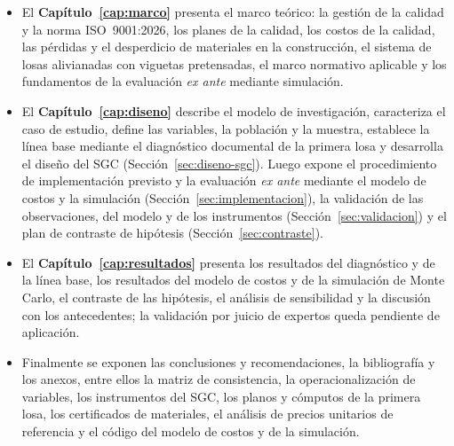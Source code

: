 \begin{itemize}
  \item El \textbf{Capítulo~\ref{cap:marco}} presenta el marco teórico: la gestión de la calidad y la norma ISO~9001:2026, los planes de la calidad, los costos de la calidad, las pérdidas y el desperdicio de materiales en la construcción, el sistema de losas alivianadas con viguetas pretensadas, el marco normativo aplicable y los fundamentos de la evaluación \emph{ex ante} mediante simulación.
  \item El \textbf{Capítulo~\ref{cap:diseno}} describe el modelo de investigación, caracteriza el caso de estudio, define las variables, la población y la muestra, establece la línea base mediante el diagnóstico documental de la primera losa y desarrolla el diseño del SGC (Sección~\ref{sec:diseno-sgc}). Luego expone el procedimiento de implementación previsto y la evaluación \emph{ex ante} mediante el modelo de costos y la simulación (Sección~\ref{sec:implementacion}), la validación de las observaciones, del modelo y de los instrumentos (Sección~\ref{sec:validacion}) y el plan de contraste de hipótesis (Sección~\ref{sec:contraste}).
  \item El \textbf{Capítulo~\ref{cap:resultados}} presenta los resultados del diagnóstico y de la línea base, los resultados del modelo de costos y de la simulación de Monte Carlo, el contraste de las hipótesis, el análisis de sensibilidad y la discusión con los antecedentes; la validación por juicio de expertos queda pendiente de aplicación.
  \item Finalmente se exponen las conclusiones y recomendaciones, la bibliografía y los anexos, entre ellos la matriz de consistencia, la operacionalización de variables, los instrumentos del SGC, los planos y cómputos de la primera losa, los certificados de materiales, el análisis de precios unitarios de referencia y el código del modelo de costos y de la simulación.
\end{itemize}

\renewcommand{\thesection}{\thechapter.\arabic{section}}
